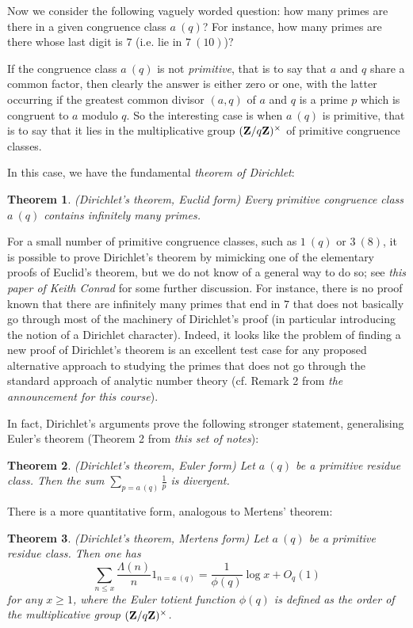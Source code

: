 \documentclass[10pt,reqno]{amsart}
\newtheorem{theorem}{Theorem}
\begin{document}
Now we consider the following vaguely worded question: how many primes are there in a given congruence class $a\ (q)$? For instance, how many primes are there whose last digit is $7$ (i.e. lie in $7\ (10)$)?

If the congruence class $a\ (q)$ is not \emph{primitive}, that is to say that $a$ and $q$ share a common factor, then clearly the answer is either zero or one, with the latter occurring if the greatest common divisor $(a,q)$ of $a$ and $q$ is a prime $p$ which is congruent to $a$ modulo $q$. So the interesting case is when $a\ (q)$ is primitive, that is to say that it lies in the multiplicative group $({\bf Z}/q{\bf Z})^\times$ of primitive congruence classes.

In this case, we have the fundamental \emph{theorem of Dirichlet}:

\begin{theorem} (Dirichlet’s theorem, Euclid form) Every primitive congruence class $a\ (q)$ contains infinitely many primes.
\end{theorem}

For a small number of primitive congruence classes, such as $1\ (q)$ or $3\ (8)$, it is possible to prove Dirichlet’s theorem by mimicking one of the elementary proofs of Euclid’s theorem, but we do not know of a general way to do so; see \emph{this paper of Keith Conrad} for some further discussion. For instance, there is no proof known that there are infinitely many primes that end in $7$ that does not basically go through most of the machinery of Dirichlet’s proof (in particular introducing the notion of a Dirichlet character). Indeed, it looks like the problem of finding a new proof of Dirichlet’s theorem is an excellent test case for any proposed alternative approach to studying the primes that does not go through the standard approach of analytic number theory (cf. Remark 2 from \emph{the announcement for this course}).

In fact, Dirichlet’s arguments prove the following stronger statement, generalising Euler’s theorem (Theorem 2 from \emph{this set of notes}):

\begin{theorem} (Dirichlet’s theorem, Euler form) Let $a\ (q)$ be a primitive residue class. Then the sum $\sum_{p = a\ (q)} \frac{1}{p}$ is divergent.
\end{theorem}

There is a more quantitative form, analogous to Mertens’ theorem:

\begin{theorem} (Dirichlet’s theorem, Mertens form) Let $a\ (q)$ be a primitive residue class. Then one has
    \[  \sum_{n \leq x} \frac{\Lambda(n)}{n} 1_{n=a\ (q)} = \frac{1}{\phi(q)} \log x + O_q(1)\]
    for any $x \geq 1$, where the \emph{Euler totient function} $\phi(q)$ is defined as the order of the multiplicative group $({\bf Z}/q{\bf Z})^\times$.
\end{theorem}
\end{document}
